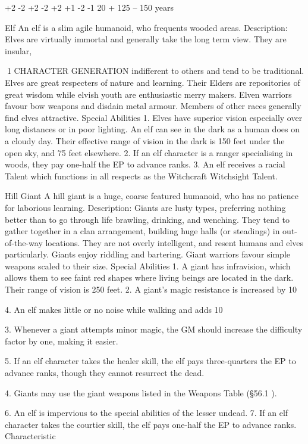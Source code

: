 \documentclass[a4paper]{article}
\begin{document}
\begin{multicols}{3}
+2
-2
+2
-2
+2
+1
-2
-1
20 +
125 – 150 years

Elf
An elf is a slim agile humanoid, who frequents
wooded areas.
Description: Elves are virtually immortal and generally take the long term view. They are insular,

1 CHARACTER GENERATION
indifferent to others and tend to be traditional.
Elves are great respecters of nature and learning.
Their Elders are repositories of great wisdom while
elvish youth are enthusiastic merry makers. Elven
warriors favour bow weapons and disdain metal
armour. Members of other races generally find
elves attractive.
Special Abilities
1. Elves have superior vision especially over long
distances or in poor lighting. An elf can see in the
dark as a human does on a cloudy day. Their effective range of vision in the dark is 150 feet under
the open sky, and 75 feet elsewhere.
2. If an elf character is a ranger specialising in
woods, they pay one-half the EP to advance ranks.
3. An elf receives a racial Talent which functions
in all respects as the Witchcraft Witchsight Talent.

Hill Giant
A hill giant is a huge, coarse featured humanoid,
who has no patience for laborious learning.
Description: Giants are lusty types, preferring
nothing better than to go through life brawling,
drinking, and wenching. They tend to gather together in a clan arrangement, building huge halls
(or steadings) in out-of-the-way locations. They are
not overly intelligent, and resent humans and elves
particularly. Giants enjoy riddling and bartering.
Giant warriors favour simple weapons scaled to
their size.
Special Abilities
1. A giant has infravision, which allows them to
see faint red shapes where living beings are located
in the dark. Their range of vision is 250 feet.
2. A giant’s magic resistance is increased by 10%

4. An elf makes little or no noise while walking
and adds 10%

3. Whenever a giant attempts minor magic, the GM
should increase the difficulty factor by one, making
it easier.

5. If an elf character takes the healer skill, the elf
pays three-quarters the EP to advance ranks,
though they cannot resurrect the dead.

4. Giants may use the giant weapons listed in the
Weapons Table (§56.1 ).

6. An elf is impervious to the special abilities of
the lesser undead.
7. If an elf character takes the courtier skill, the elf
pays one-half the EP to advance ranks.
Characteristic


\end{multicols}
\end{document}
